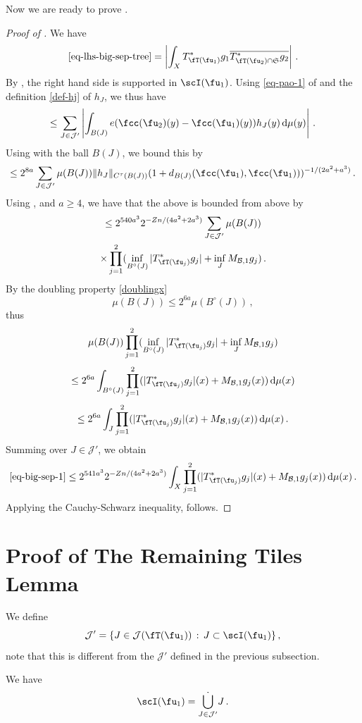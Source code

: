     Now we are ready to prove .
    \begin{proof}[Proof of ]
    We have
    $$
        \eqref{eq-lhs-big-sep-tree} = \left| \int_{X} T_{\fT(\fu_1)}^* g_1 \overline{T_{\fT(\fu_2) \cap \mathfrak{S}}^* g_2 }\right|\,.
    $$
    By , the right hand side is supported in $\scI(\fu_1)$. Using \eqref{eq-pao-1} of  and the definition \eqref{def-hj} of $h_J$, we thus have
    $$
        \le \sum_{J \in \mathcal{J}'} \left|\int_{B(J)} e(\fcc(\fu_2)(y) - \fcc(\fu_1)(y)) h_J(y) \, \mathrm{d}\mu(y) \right|\,.
    $$
    Using  with the ball $B(J)$, we bound this by
    $$
        \le 2^{8a} \sum_{J \in \mathcal{J}'} \mu(B(J)) \|h_J\|_{C^{\tau}(B(J))} (1 + d_{B(J)}(\fcc(\fu_1), \fcc(\fu_1)))^{-1/(2a^2+a^3)}\,.
    $$
    Using ,  and $a \ge 4$, we have that the above is bounded from above by
    \begin{multline}
        \label{eq-big-sep-1}
        \le 2^{540a^3} 2^{-Zn/(4a^2 + 2a^3)} \sum_{J \in \mathcal{J}'} \mu(B(J)) \\
        \times \prod_{j=1}^2 (\inf_{B^\circ{}(J)} |T_{\fT(\fu_j)}^* g_j| + \inf_J M_{\mathcal{B},1} g_j)\,.
    \end{multline}
    By the doubling property \eqref{doublingx}
    $$
        \mu(B(J)) \le 2^{6a} \mu(B^\circ{}(J))\,,
    $$
    thus
    $$
        \mu(B(J)) \prod_{j=1}^2 (\inf_{B^\circ{}(J)} |T_{\fT(\fu_j)}^* g_j| + \inf_J M_{\mathcal{B},1} g_j)
    $$
    $$
        \le 2^{6a} \int_{B^\circ{}(J)} \prod_{j=1}^2 ( |T_{\fT(\fu_j)}^* g_j|(x) + M_{\mathcal{B},1} g_j(x)) \, \mathrm{d}\mu(x)
    $$
    $$
        \le 2^{6a} \int_J \prod_{j=1}^2 ( |T_{\fT(\fu_j)}^* g_j|(x) + M_{\mathcal{B},1} g_j(x)) \, \mathrm{d}\mu(x)\,.
    $$
    Summing over $J \in \mathcal{J}'$, we obtain
    $$
        \eqref{eq-big-sep-1} \le 2^{541a^3} 2^{-Zn/(4a^2 + 2a^3)} \int_X \prod_{j=1}^2 ( |T_{\fT(\fu_j)}^* g_j|(x) + M_{\mathcal{B},1} g_j(x)) \, \mathrm{d}\mu(x)\,.
    $$
    Applying the Cauchy-Schwarz inequality,  follows.
    \end{proof}

\section{Proof of The Remaining Tiles Lemma}
    \label{subsec-rest-tiles}
    We define
    $$
        \mathcal{J}' = \{J \in \mathcal{J}(\fT(\fu_1)) \, : \, J \subset \scI(\fu_1)\}\,,
    $$
    note that this is different from the $\mathcal{J}'$ defined in the previous subsection.
    \begin{lemma}
        \label{dyadic-partition-2}
        \leanok
        We have
        $$
            \scI(\fu_1) = \dot{\bigcup_{J \in \mathcal{J}'}} J\,.
        $$
    \end{lemma}

